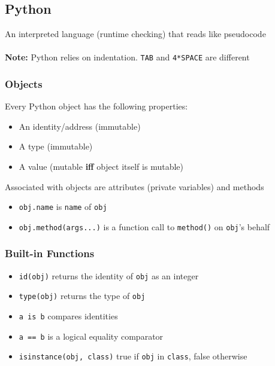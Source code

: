 \documentclass[13pt]{article}
\begin{document}
      \subsection{Python}
      An interpreted language (runtime checking) that reads like pseudocode \\ \\
      \textbf{Note:} Python relies on indentation. \texttt{TAB} and \texttt{4*SPACE} are different

      \subsubsection{Objects}
      Every Python object has the following properties:
      \begin{itemize}[leftmargin = 0pt]
      \item [] An identity/address (immutable)
      \item [] A type (immutable)
      \item [] A value (mutable \textbf{iff} object itself is mutable)
      \end{itemize}
      Associated with objects are attributes (private variables) and methods
      \begin{itemize}[leftmargin = 0pt]
      \item [] \texttt{obj.name} is \texttt{name} of \texttt{obj}
      \item [] \texttt{obj.method(args...)} is a function call to \texttt{method()} on \texttt{obj}'s behalf
      \end{itemize}

      \subsubsection{Built-in Functions}
      \begin{itemize}[leftmargin = 0pt]
      \item [] \texttt{id(obj)} returns the identity of \texttt{obj} as an integer
      \item [] \texttt{type(obj)} returns the type of \texttt{obj}
      \item [] \texttt{a is b} compares identities
      \item [] \texttt{a == b} is a logical equality comparator
      \item [] \texttt{isinstance(obj, class)} true if \texttt{obj} in \texttt{class}, false otherwise
      \end{itemize}
\end{document}
